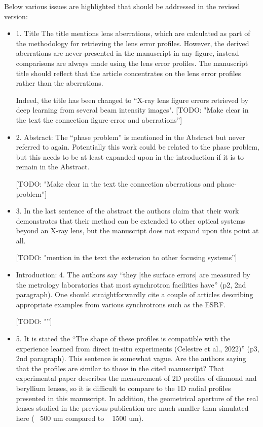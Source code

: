 \documentclass[11pt]{letter} %
\newcommand{\todo}[1]{{\color{red}[TODO: "#1'']}}
\newcommand{\inred}[1]{{\color{red}#1}}
\begin{document}
\begin{letter}{}
Below various issues are highlighted that should be addressed in the revised version:

\begin{itemize}
    \item 1. Title The title mentions lens aberrations, which are calculated as part of the methodology for retrieving the lens error profiles. However, the derived aberrations are never presented in the manuscript in any figure, instead comparisons are always made using the lens error profiles. The manuscript title should reflect that the article concentrates on the lens error profiles rather than the aberrations.
    
    \inred{Indeed, the title has been changed to ``X-ray lens figure errors retrieved by deep learning from several beam intensity images".} \todo{Make clear in the text the connection figure-error and aberrations}
    
    \item 2. Abstract: The “phase problem” is mentioned in the Abstract but never referred to again. Potentially this work could be related to the phase problem, but this needs to be at least expanded upon in the introduction if it is to remain in the Abstract.
    
    \todo{Make clear in the text the connection aberrations and phase-problem}
    
    \item 3. In the last sentence of the abstract the authors claim that their work demonstrates that their method can be extended to other optical systems beyond an X-ray lens, but the manuscript does not expand upon this point at all.
    
    \todo{mention in the text the extension to other focusing systems}
    

    \item Introduction: 4. The authors say “they [the surface errors] are measured by the metrology laboratories that most synchrotron facilities have” (p2, 2nd paragraph). One should straightforwardly cite a couple of articles describing appropriate examples from various synchrotrons such as the ESRF.
    
    \todo{}
    

    \item 5. It is stated the “The shape of these profiles is compatible with the experience learned from direct in-situ experiments (Celestre et al., 2022)” (p3, 2nd paragraph). This sentence is somewhat vague. Are the authors saying that the profiles are similar to those in the cited manuscript? That experimental paper describes the measurement of 2D profiles of diamond and beryllium lenses, so it is difficult to compare to the 1D radial profiles presented in this manuscript. In addition, the geometrical aperture of the real lenses studied in the previous publication are much smaller than simulated here (~ 500 um compared to ~ 1500 um).
    

\end{itemize}
\end{letter}
\end{document}
